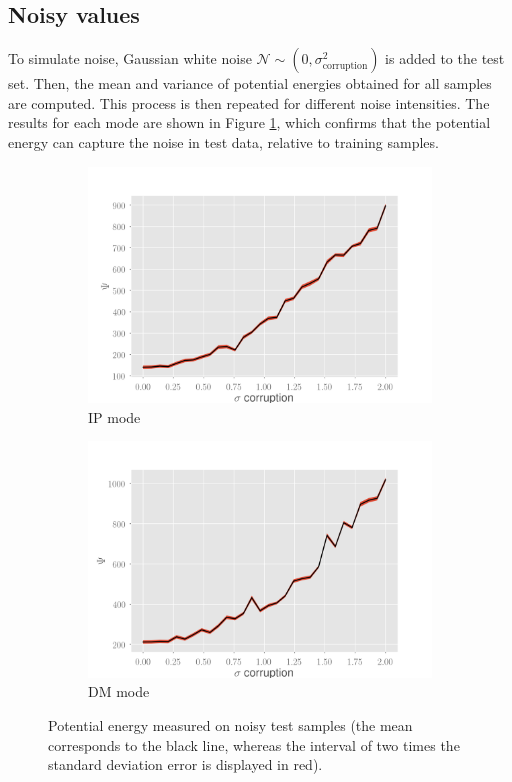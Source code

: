 \subsection*{Noisy values}
To simulate noise, Gaussian white noise $\mathcal{N} \sim (0, \sigma_{\mbox{corruption}}^2)$ is added to the test set. Then, the mean and variance of potential energies obtained for all samples are computed. This process is then repeated for different noise intensities. The results for each mode are shown in Figure \ref{fig:pot-noisy-signal}, which confirms that the potential energy can capture the noise in test data, relative to training samples.
\begin{figure}[!h]
\centering
\begin{subfigure}{.5\textwidth}
  \centering
  \includegraphics[width=\linewidth]{figures/noisy-signal-ip}
  \caption{IP mode}
\end{subfigure}%
\begin{subfigure}{.5\textwidth}
  \centering
  \includegraphics[width=\linewidth]{figures/noisy-signal-dm-snr}
  \caption{DM mode}
\end{subfigure}
\caption[Potential energy measured on noisy test samples]{Potential energy measured on noisy test samples (the mean corresponds to the black line, whereas the interval of two times the standard deviation error is displayed in red).}
\label{fig:pot-noisy-signal}
\end{figure}

